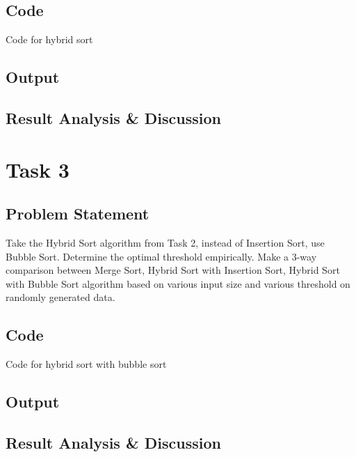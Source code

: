 \subsection{Code}
\begin{code}
    \label{code:hybrid}
    \caption{Code for hybrid sort}
\end{code}
\subsection{Output}
\subsection{Result Analysis \& Discussion}

\newpage
\section{Task 3}
\subsection{Problem Statement}
Take the Hybrid Sort algorithm from Task 2, instead of Insertion Sort, use
Bubble Sort. Determine the optimal threshold empirically. Make a 3-way
comparison between Merge Sort, Hybrid Sort with Insertion Sort, Hybrid Sort
with Bubble Sort algorithm based on various input size and various threshold on
randomly generated data.
\subsection{Code}
\begin{code}
    \label{code:bubble}
    \caption{Code for hybrid sort with bubble sort}
\end{code}
\subsection{Output}
\subsection{Result Analysis \& Discussion}
